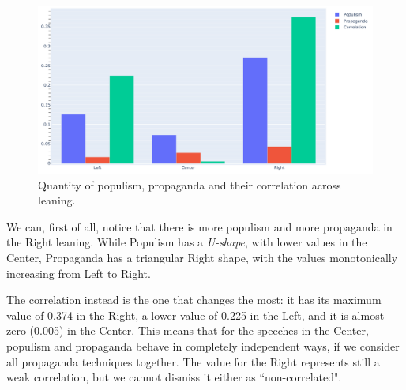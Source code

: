 \begin{figure}[!htbp]
    \centering
    \includegraphics[width=\linewidth]{figures/populism_propaganda_quantities_by_leaning.pdf}
    \caption{Quantity of populism, propaganda and their correlation across leaning.}
    \label{fig:populism_propaganda_quantities_by_leaning}
\end{figure}

We can, first of all, notice that there is more populism and more propaganda in the Right leaning.
While Populism has a \emph{U-shape}, with lower values in the Center, Propaganda has a triangular Right shape, with the values monotonically increasing from Left to Right.

The correlation instead is the one that changes the most: it has its maximum value of 0.374 in the Right, a lower value of 0.225 in the Left, and it is almost zero (0.005) in the Center.
This means that for the speeches in the Center, populism and propaganda behave in completely independent ways, if we consider all propaganda techniques together.
The value for the Right represents still a weak correlation, but we cannot dismiss it either as ``non-correlated".



